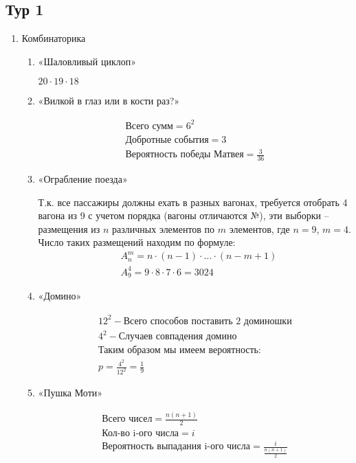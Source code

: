\documentclass[11pt, a4paper]{article}
\theoremstyle{definition}
\begin{document}
\subsection{Тур 1}
\begin{enumerate}
    \item Комбинаторика

\begin{enumerate}
    \item «Шаловливый циклоп»
    
    $20 \cdot 19 \cdot 18$
    
    \item «Вилкой в глаз или в кости раз?»
    
    \begin{align*}
        \text{Всего сумм} = 6^{2}\\
        \text{Добротные события} = 3\\
        \text{Вероятность победы Матвея} = \frac{3}{36}
    \end{align*} 
    
    \item «Ограбление поезда»
    
    Т.к. все пассажиры должны ехать в разных вагонах, требуется
    отобрать 4 вагона из 9 с учетом порядка (вагоны отличаются №), эти выборки – размещения из $n$ различных элементов по $m$ элементов, где $n=9$, $m=4$. Число таких размещений находим по формуле: 
    \begin{align*}
        & A_{n}^{m} = n \cdot (n - 1) \cdot \ldots \cdot (n - m + 1)\\
        & A_{9}^{4} = 9 \cdot 8 \cdot 7 \cdot 6 = 3024
    \end{align*} 
    
    \item «Домино»
    
    \begin{align*}
        12^{2} - \text{Всего способов поставить 2 доминошки}\\
        4^{2} - \text{Случаев совпадения домино}\\
        \text{Таким образом мы имеем вероятность:}\\
        p = \frac{4^{2}}{12^{2}} = \frac{1}{9}
    \end{align*}
    
    
    \item «Пушка Моти»
    
    \begin{align*}
        \text{Всего чисел} = \frac{n(n + 1)}{2}\\
        \text{Кол-во i-ого числа} = i\\
        \text{Вероятность выпадания i-ого числа} = \frac{i}{\frac{n(n + 1)}{2}}
    \end{align*} 
    

\end{enumerate}
\end{enumerate}
\end{document}
